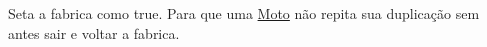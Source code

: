 Seta a fabrica como true. Para que uma \mbox{\hyperlink{class_moto}{Moto}} não repita sua duplicação sem antes sair e voltar a fabrica. ~\newline
~\newline
~\newline
~\newline
~\newline
~\newline
~\newline
~\newline
~\newline
~\newline
~\newline
~\newline
~\newline
~\newline
~\newline
~\newline
~\newline
~\newline
~\newline
~\newline
~\newline
~\newline
~\newline
~\newline
~\newline
~\newline
~\newline
~\newline
~\newline
~\newline
~\newline
~\newline
~\newline
~\newline
~\newline
~\newline
~\newline
~\newline
~\newline
~\newline
~\newline
~\newline
~\newline
~\newline
~\newline
~\newline
~\newline
~\newline
~\newline
~\newline
